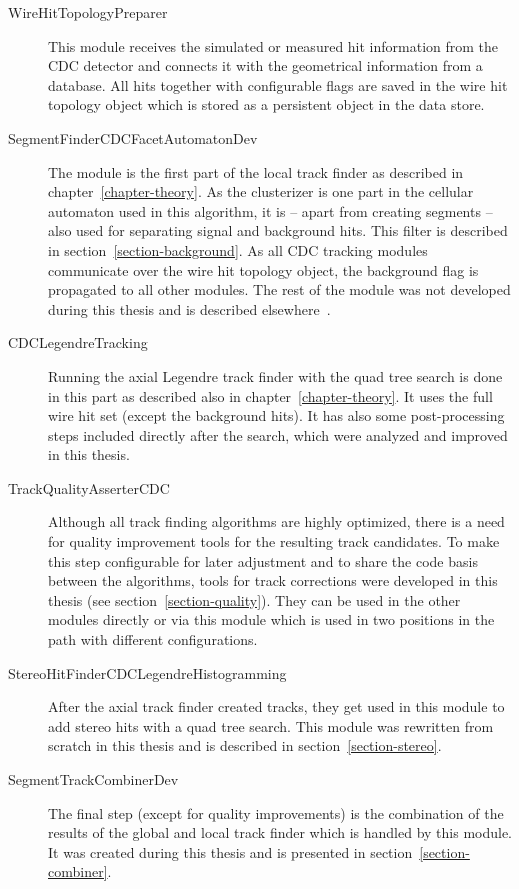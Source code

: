 \begin{description}
  \item[Wire\-Hit\-Topology\-Preparer] This module receives the simulated or measured hit information from the CDC detector and connects it with the geometrical information from a database. All hits together with configurable flags are saved in the wire hit topology object which is stored as a persistent object in the data store.
  \item[Segment\-Finder\-CDC\-Facet\-Automaton\-Dev] The module is the first part of the local track finder as described in chapter~\ref{chapter-theory}. As the clusterizer is one part in the cellular automaton used in this algorithm, it is -- apart from creating segments -- also used for separating signal and background hits. This filter is described in section~\ref{section-background}. As all CDC tracking modules communicate over the wire hit topology object, the background flag is propagated to all other modules. The rest of the module was not developed during this thesis and is described elsewhere~\cite{oliver}.
  \item[CDC\-Legendre\-Tracking] Running the axial Legendre track finder with the quad tree search is done in this part as described also in chapter~\ref{chapter-theory}. It uses the full wire hit set (except the background hits). It has also some post-processing steps included directly after the search, which were analyzed and improved in this thesis.
  \item[Track\-Quality\-Asserter\-CDC] Although all track finding algorithms are highly optimized, there is a need for quality improvement tools for the resulting track candidates. To make this step configurable for later adjustment and to share the code basis between the algorithms, tools for track corrections were developed in this thesis (see section~\ref{section-quality}). They can be used in the other modules directly or via this module which is used in two positions in the path with different configurations.
  \item[Stereo\-Hit\-Finder\-CDC\-Legendre\-Histogramming] After the axial track finder created tracks, they get used in this module to add stereo hits with a quad tree search. This module was rewritten from scratch in this thesis and is described in section~\ref{section-stereo}.
  \item[Segment\-Track\-Combiner\-Dev] The final step (except for quality improvements) is the combination of the results of the global and local track finder which is handled by this module. It was created during this thesis and is presented in section~\ref{section-combiner}.
\end{description}

